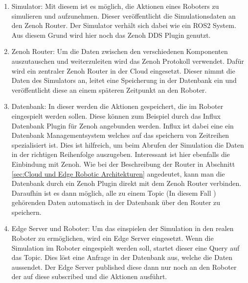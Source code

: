 \begin{enumerate}
  \item Simulator: Mit diesem ist es möglich, die Aktionen eines Roboters zu simulieren und aufzunehmen. Dieser veröffentlicht die Simulationsdaten an den Zenoh Router. Der Simulator verhält sich dabei wie ein ROS2 System. Aus diesem Grund wird hier noch das Zenoh DDS Plugin genutzt.
  \item Zenoh Router: Um die Daten zwischen den verschiedenen Komponenten auszutauschen und weiterzuleiten wird das Zenoh Protokoll verwendet. Dafür wird ein zentraler Zenoh Router in der Cloud eingesetzt. Dieser nimmt die Daten des Simulators an, leitet eine Speicherung in der Datenbank ein und veröffentlicht diese an einem späteren Zeitpunkt an den Roboter.
  \item Datenbank: In dieser werden die Aktionen gespeichert, die im Roboter eingespielt werden sollen. Diese können zum Beispiel durch das Influx Datenbank Plugin für Zenoh angebunden werden. Influx ist dabei eine ein Datenbank Managementsystem welches auf das speichern von Zeitreihen spezialisiert ist. Dies ist hilfreich, um beim Abrufen der Simulation die Daten in der richtigen Reihenfolge auszugeben. Interessant ist hier ebenfalls die Einbindung mit Zenoh. Wie bei der Beschreibung der Router in Abschnitt \ref{sec:Cloud und Edge Robotic Architekturen} angedeutet, kann man die Datenbank durch ein Zenoh Plugin direkt mit dem Zenoh Router verbinden. Daraufhin ist es dann möglich, alle zu einem Topic (In diesem Fall ) gehörenden Daten automatisch in der Datenbank über den Router zu speichern.
  \item Edge Server und Roboter: Um das einspielen der Simulation in den realen Roboter zu ermöglichen, wird ein Edge Server eingesetzt. Wenn die Simulation im Roboter eingespielt werden soll, startet dieser eine Query auf das  Topic. Dies löst eine Anfrage in der Datenbank aus, welche die Daten aussendet. Der Edge Server published diese dann nur noch an den Roboter der auf diese subscribed und die Aktionen ausführt.
\end{enumerate}

